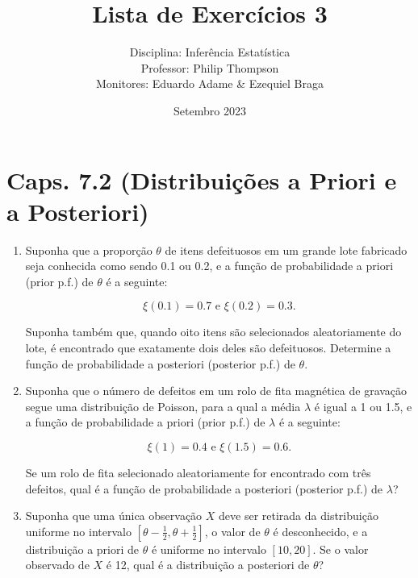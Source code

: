 \documentclass[leqno, 12pt]{article}
\title{Lista de Exercícios 3}
\author{Disciplina: Inferência Estatística \\
        Professor: Philip Thompson \\
        Monitores: Eduardo Adame \& Ezequiel Braga}
\date{Setembro 2023}
\theoremstyle{definition}
\begin{document}
\maketitle

\section*{Caps. 7.2 (Distribuições a Priori e a Posteriori)}

\begin{enumerate}


\item \textbf{\parencite[ex. 2, pág. 393]{DeGroot:2014}} Suponha que a proporção $\theta$ de itens defeituosos em um grande lote fabricado seja conhecida como sendo 0.1 ou 0.2, e a função de probabilidade a priori (prior p.f.) de $\theta$ é a seguinte:

\[\xi(0.1) = 0.7 \text{ e } \xi(0.2) = 0.3.\] 

Suponha também que, quando oito itens são selecionados aleatoriamente do lote, é encontrado que exatamente dois deles são defeituosos. Determine a função de probabilidade a posteriori (posterior p.f.) de $\theta$.


\item \textbf{\parencite[ex. 3, pág. 394]{DeGroot:2014}} Suponha que o número de defeitos em um rolo de fita magnética de gravação segue uma distribuição de Poisson, para a qual a média $\lambda$ é igual a 1 ou 1.5, e a função de probabilidade a priori (prior p.f.) de $\lambda$ é a seguinte:

\[\xi(1) = 0.4 \text{ e } \xi(1.5) = 0.6.\]

Se um rolo de fita selecionado aleatoriamente for encontrado com três defeitos, qual é a função de probabilidade a posteriori (posterior p.f.) de $\lambda$?


\item \textbf{\parencite[ex. 10, pág. 394]{DeGroot:2014}} Suponha que uma única observação $X$ deve ser retirada da distribuição uniforme no intervalo $[\theta - \frac{1}{2}, \theta + \frac{1}{2}]$, o valor de $\theta$ é desconhecido, e a distribuição a priori de $\theta$ é uniforme no intervalo $[10, 20]$. Se o valor observado de $X$ é 12, qual é a distribuição a posteriori de $\theta$?


\end{enumerate}
\end{document}

